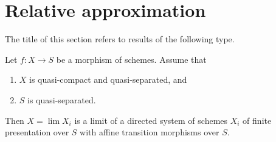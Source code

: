 \section{Relative approximation}
\label{section-relative-approximation}

\noindent
The title of this section refers to results of the following type.

\begin{lemma}
\label{lemma-relative-approximation}
Let $f : X \to S$ be a morphism of schemes. Assume that
\begin{enumerate}
\item $X$ is quasi-compact and quasi-separated, and
\item $S$ is quasi-separated.
\end{enumerate}
Then $X = \lim X_i$ is a limit of a directed system of schemes
$X_i$ of finite presentation over $S$ with affine transition morphisms
over $S$.
\end{lemma}

